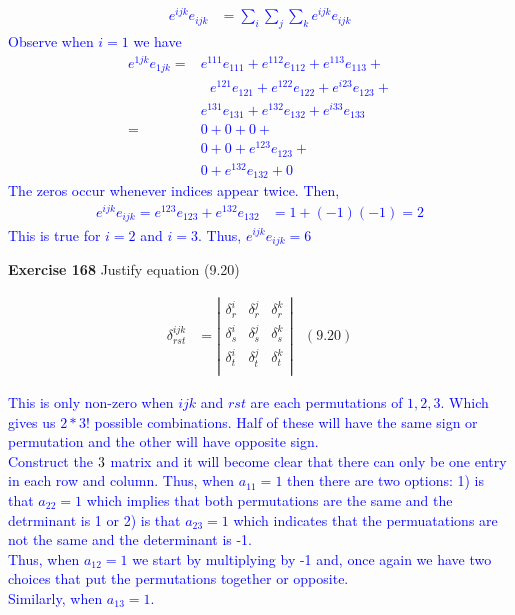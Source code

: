 \documentclass[12pt,a4paper]{report}
\newcommand{\BLUE}[1]{\textcolor{blue}{#1}}
\begin{document}
\BLUE{\begin{align*}
	e^{ijk}e_{ijk} &= \sum_i\sum_j\sum_k e^{ijk}e_{ijk} 
\end{align*}Observe when $i=1$ we have 
\begin{align*}
	e^{1jk}e_{1jk} =& e^{111}e_{111}+e^{112}e_{112} + e^{113}e_{113} + \\
	&\text{ }e^{121}e_{121}+e^{122}e_{122} + e^{i23}e_{123} +\\
	& e^{131}e_{131}+e^{132}e_{132} + e^{i33}e_{133} \\
	=& 0+0 + 0 + \\
	& 0+0 + e^{123}e_{123} +\\
	& 0+e^{132}e_{132} + 0
\end{align*}The zeros occur whenever indices appear twice.  Then,
\begin{align*}
	e^{ijk}e_{ijk} = e^{123}e_{123} + e^{132}e_{132} &= 1 + (-1)(-1) = 2\end{align*}This is true for $i=2$ and $i=3$.  Thus, $e^{ijk}e_{ijk} = 6$
}

\textbf{Exercise 168} Justify equation (9.20)

\begin{align*}
	\delta_{rst}^{ijk} &= \left |\begin{array}{ccc}
		\delta_r^i & \delta_r^j & \delta_r^k \\
		\delta_s^i & \delta_s^j & \delta_s^k \\
		\delta_t^i & \delta_t^j & \delta_t^k \\
	\end{array} \right | & (9.20)
\end{align*}


\BLUE{This is only non-zero when $ijk$ and $rst$ are each permutations of $1, 2,3$.  Which gives us $2 * 3!$ possible combinations.  Half of these will have the same sign or permutation and the other will have opposite sign.\\
Construct the $3 \time 3$ matrix and it will become clear that there can only be one entry in each row and column.  Thus, when $a_{11}=1$ then there are two options: 1) is that $a_{22}=1$ which implies that both permutations are the same and the detrminant is 1  or 2) is that $a_{23}=1$ which indicates that the permuatations are not the same and the determinant is -1.\\
Thus, when $a_{12}=1$ we start by multiplying by -1 and, once again we have two choices that put the permutations together or opposite.\\
Similarly, when $a_{13}=1$.
}
\end{document}
